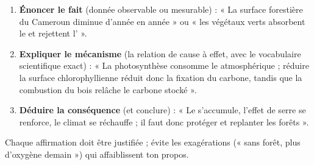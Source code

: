 \documentclass[11pt]{article}
\begin{document}
\begin{methode}
\begin{enumerate}
\item \textbf{Énoncer le fait} (donnée observable ou mesurable) : « La surface forestière du Cameroun diminue d'année en année » ou « les végétaux verts absorbent le  et rejettent l' ».
\item \textbf{Expliquer le mécanisme} (la relation de cause à effet, avec le vocabulaire scientifique exact) : « La photosynthèse consomme le  atmosphérique ; réduire la surface chlorophyllienne réduit donc la fixation du carbone, tandis que la combustion du bois relâche le carbone stocké ».
\item \textbf{Déduire la conséquence} (et conclure) : « Le  s'accumule, l'effet de serre se renforce, le climat se réchauffe ; il faut donc protéger et replanter les forêts ».
\end{enumerate}
Chaque affirmation doit être justifiée ; évite les exagérations (« sans forêt, plus d'oxygène demain ») qui affaiblissent ton propos.
\end{methode}
\end{document}
